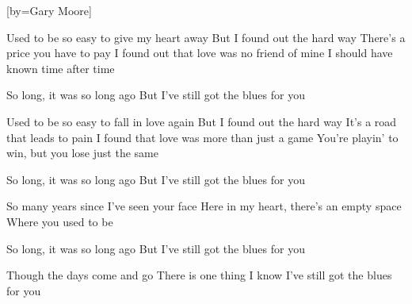 [by={Gary Moore}]


  \beginverse
  Used to be so easy to give my heart away
  But I found out the hard way
  There's a price you have to pay
  I found out that love was no friend of mine
  I should have known time after time
  \endverse
  
  \beginchorus
  So long, it was so long ago
  But I've still got the blues for you
  \endchorus

  \beginverse
  Used to be so easy to fall in love again
  But I found out the hard way
  It's a road that leads to pain
  I found that love was more than just a game
  You're playin' to win, but you lose just the same
  \endverse

  \beginchorus
  So long, it was so long ago
  But I've still got the blues for you
  \endchorus

  \beginverse
  So many years since I've seen your face
  Here in my heart, there's an empty space
  Where you used to be
  \endverse


  \beginchorus
  So long, it was so long ago
  But I've still got the blues for you
  \endchorus

  \beginchorus
  Though the days come and go
  There is one thing I know
  I've still got the blues for you
  \endchorus

\endsong
